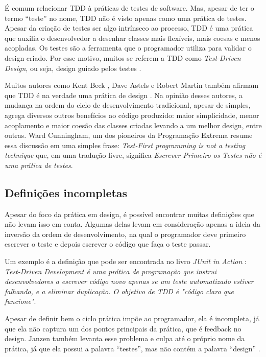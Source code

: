 É comum relacionar TDD à práticas de testes de software. Mas, apesar de ter o
termo ``teste'' no nome, TDD não é visto apenas como uma prática de testes.
Apesar da criação de testes ser algo intrínseco ao processo, TDD é uma prática
que auxilia o desenvolvedor a desenhar classes mais flexíveis, mais coesas e
menos acopladas. Os testes são a ferramenta que o programador utiliza para
validar o design criado. Por esse motivo, muitos se referem a TDD como
\textit{Test-Driven Design}, ou seja, design guiado pelos testes
\cite{tdd-taxonomy}.

Muitos autores como Kent Beck \cite{aim-fire}, Dave Astels \cite{astels-tdd} e
Robert Martin \cite{bob-martin} também afirmam que TDD é na verdade uma prática de
design \cite{tdd-taxonomy} \cite{aim-fire}.
Na opinião desses autores, a mudança na ordem do ciclo de
desenvolvimento tradicional, apesar de simples, agrega diversos outros
benefícios ao código produzido: maior simplicidade, menor acoplamento e maior
coesão das classes criadas levando a um melhor design, entre
outras. Ward Cunningham, um dos pioneiros da Programação Extrema resume essa 
discussão em uma simples frase: \textit{Test-First programming is not a testing technique} 
que, em uma tradução livre, significa \textit{Escrever Primeiro os Testes
não é uma prática de testes}.

\subsection{Definições incompletas}

Apesar do foco da prática em design, é possível encontrar muitas definições que
não levam isso em conta. Algumas delas levam em consideração apenas a ideia da
inversão da ordem de desenvolvimento, na qual o programador deve primeiro
escrever o teste e depois escrever o código que faça o teste passar.

Um exemplo é a definição que pode ser encontrada no livro \textit{JUnit
in Action} \cite{junit-in-action}: \textit{Test-Driven Development é uma
prática de programação que instrui desenvolvedores a escrever código novo
apenas se um teste automatizado estiver falhando, e a eliminar duplicação. O
objetivo de TDD é "código claro que funcione"}.

Apesar de definir bem o ciclo prática impõe ao programador, ela é incompleta, já
que ela não captura um dos pontos principais da prática, que é feedback no design. 
Janzen também levanta esse problema e culpa até o próprio nome da prática, já
que ela possui a palavra ``testes'', mas não contém a palavra ``design'' 
\cite{tdd-really-improve}.

